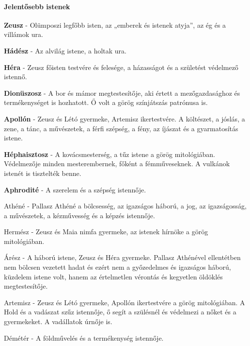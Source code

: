 \paragraph{Jelentősebb istenek}
\begin{compactitem}
	\item \textbf{Zeusz} - Olümposzi legfőbb isten, az „emberek és istenek atyja”, az ég és a villámok ura. 
	
	\item \textbf{Hádész} - Az alvilág istene, a holtak ura.
	
	\item \textbf{Héra} -  Zeusz főisten testvére és felesége, a házasságot és a születést védelmező istennő.
	
	\item \textbf{Dionüszosz} - A bor és mámor megtestesítője, aki értett a mezőgazdasághoz és termékenységet is hozhatott. Ő volt a görög színjátszás patrónusa is.
	
	\item \textbf{Apollón} -  Zeusz és Létó gyermeke, Artemisz ikertestvére. A költészet, a jóslás, a zene, a tánc, a művészetek, a férfi szépség, a fény, az íjászat és a gyarmatosítás istene.
	
	\item \textbf{Héphaisztosz} - A kovácsmesterség, a tűz istene a görög mitológiában. Védelmezője minden mesterembernek, főként a fémműveseknek. A vulkánok istenét is tisztelték benne. 
	
	\item \textbf{Aphrodité} - A szerelem és a szépség istennője. 
	
	\item Athéné - Pallasz Athéné a bölcsesség, az igazságos háború, a jog, az igazságosság, a művészetek, a kézművesség és a képzés istennője.
	
	\item Hermész -  Zeusz és Maia nimfa gyermeke, az istenek hírnöke a görög mitológiában.
	
	\item Árész - A háború istene, Zeusz és Héra gyermeke. Pallasz Athénével ellentétben nem bölcsen vezetett hadat és ezért nem a győzedelmes és igazságos háború, küzdelem istene volt, hanem az értelmetlen vérontás és kegyetlen öldöklés megtestesítője.
	
	\item Artemisz -  Zeusz és Létó gyermeke, Apollón ikertestvére a görög mitológiában. A Hold és a vadászat szűz istennője, ő segít a szülésnél és védelmezi a nőket és a gyermekeket. A vadállatok úrnője is.
	
	\item Démétér - A földművelés és a termékenység istennője.
\end{compactitem}

